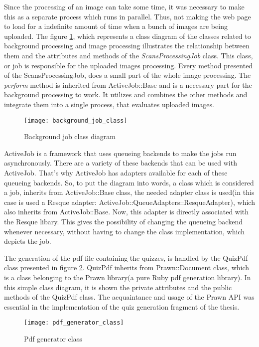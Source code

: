 Since the processing of an image can take some time, it was necessary to make this as a separate process which runs in parallel. Thus, not making the web page to load for a indefinite amount of time when a bunch of images are being uploaded. The figure \ref{job_class}, which represents a class diagram of the classes related to background processing and image processing illustrates the relationship between them and the attributes and methods of the \textit{ScansProcessingJob} class. This class, or job is responsible for the uploaded images processing. Every method presented of the ScansProcessingJob, does a small part of the whole image processing. The \textit{perform} method is inherited from ActiveJob::Base and is a necessary part for the background processing to work. It utilizes and combines the other methods and integrate them into a single process, that evaluates uploaded images. 

\begin{figure}[!ht]
\centering
\texttt{[image: background\_job\_class]}
\caption{Background job class diagram}\label{job_class}
\end{figure}

ActiveJob is a framework that uses queueing backends to make the jobs run asynchronously. There are a variety of these backends that can be used with ActiveJob. That's why ActiveJob has adapters available for each of these queueing backends. So, to put the diagram into words, a class which is considered a job, inherits from ActiveJob::Base class, the needed adapter class is used(in this case is used a Resque adapter: ActiveJob::QueueAdapters::ResqueAdapter), which also inherits from ActiveJob::Base. Now, this adapter is directly associated with the Resque libary. This gives the possibility of changing the queueing backend whenever necessary, without having to change the class implementation, which depicts the job. 


The generation of the pdf file containing the quizzes, is handled by the QuizPdf class presented in figure \ref{pdf_class}. QuizPdf inherits from Prawn::Document class, which is a class belonging to the Prawn library(a pure Ruby pdf generation library). In this simple class diagram, it is shown the private attributes and the public methods of the QuizPdf class. The acquaintance and usage of the Prawn API was essential in the implementation of the quiz generation fragment of the thesis.

\begin{figure}[!ht]
\centering
\texttt{[image: pdf\_generator\_class]}
\caption{Pdf generator class}\label{pdf_class}
\end{figure}

